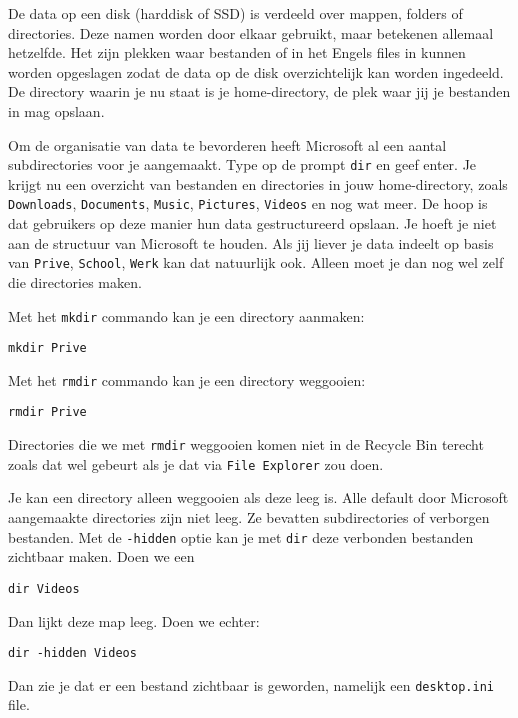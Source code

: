 De data op een disk (harddisk of SSD) is verdeeld over mappen, folders of directories. Deze namen worden door elkaar gebruikt, maar betekenen allemaal hetzelfde. Het zijn plekken waar bestanden of in het Engels files in kunnen worden opgeslagen zodat de data op de disk overzichtelijk kan worden ingedeeld. De directory waarin je nu staat is je home-directory, de plek waar jij je bestanden in mag opslaan.

Om de organisatie van data te bevorderen heeft Microsoft al een aantal subdirectories voor je aangemaakt. Type op de prompt \texttt{dir} en geef enter. Je krijgt nu een overzicht van bestanden en directories in jouw home-directory, zoals \texttt{Downloads}, \texttt{Documents}, \texttt{Music}, \texttt{Pictures}, \texttt{Videos} en nog wat meer. De hoop is dat gebruikers op deze manier hun data gestructureerd opslaan. Je hoeft je niet aan de structuur van Microsoft te houden. Als jij liever je data indeelt op basis van \texttt{Prive}, \texttt{School}, \texttt{Werk} kan dat natuurlijk ook. Alleen moet je dan nog wel zelf die directories maken.

Met het \texttt{mkdir} commando kan je een directory aanmaken:
\begin{lstlisting}[style=DOS]
mkdir Prive
\end{lstlisting}

Met het \texttt{rmdir} commando kan je een directory weggooien:
\begin{lstlisting}[style=DOS]
rmdir Prive
\end{lstlisting}
Directories die we met \texttt{rmdir} weggooien komen niet in de Recycle Bin terecht zoals dat wel gebeurt als je dat via \texttt{File Explorer} zou doen.

Je kan een directory alleen weggooien als deze leeg is. Alle default door Microsoft aangemaakte directories zijn niet leeg. Ze bevatten subdirectories of verborgen bestanden. Met de \texttt{-hidden} optie kan je met \texttt{dir} deze verbonden bestanden zichtbaar maken. Doen we een
\begin{lstlisting}[style=DOS]
dir Videos
\end{lstlisting}
Dan lijkt deze map leeg. Doen we echter:
\begin{lstlisting}[style=DOS]
dir -hidden Videos
\end{lstlisting}
Dan zie je dat er een bestand zichtbaar is geworden, namelijk een \texttt{desktop.ini} file.

